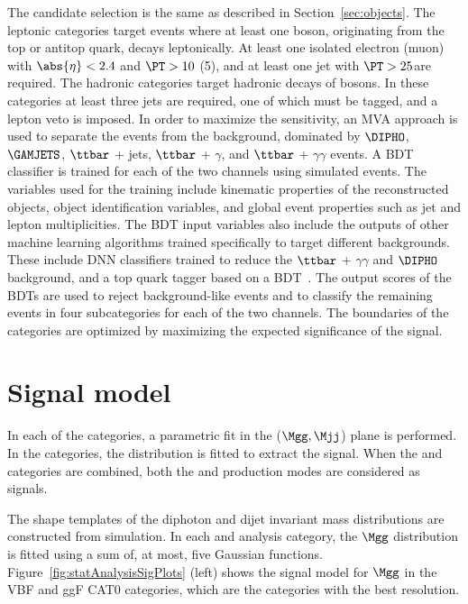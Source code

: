 \documentclass[11pt,a4paper,cmspaper,final,collab]{cms-tdr}
\begin{document}
The \Hgg candidate selection is the same as described in Section~\ref{sec:objects}. 
The \ttH leptonic categories target \ttH events where at least one \PW boson, originating from the top or antitop quark, decays leptonically. At least one isolated electron (muon) with $\abs{\eta} <2.4$ and $\PT>10$ (5)\GeV, and at least one jet with $\PT>25$\GeV are required. The \ttH hadronic categories target hadronic decays of \PW bosons. In these categories at least three jets are required, one of which must be {\cPqb} tagged, and a lepton veto is imposed. In order to maximize the sensitivity, an MVA approach is used to separate the \ttH events from the background, dominated by $\DIPHO$, $\GAMJETS$, $\ttbar$ + jets, $\ttbar$ + $\gamma$, and $\ttbar$ + $\gamma\gamma$ events. A BDT classifier is trained for each of the two channels using simulated events.
The variables used for the training include kinematic properties of the reconstructed objects, object identification variables, and global event properties such as jet and lepton multiplicities. The BDT input variables also include the outputs of other machine learning algorithms trained specifically to target different backgrounds.
These include DNN classifiers trained to reduce the $\ttbar$ + $\gamma\gamma$ and $\DIPHO$ background, and a top quark tagger based on a BDT~\cite{Sirunyan:2017wif}.
 The output scores of the BDTs are used to reject background-like events and to classify the remaining  events in four subcategories for each of the two channels. The boundaries of the categories are optimized by maximizing the expected significance of the \ttH signal.



\section{Signal model}
\label{sec:signal}

In each of the \HH categories, a parametric fit in the ($\Mgg,\Mjj$) plane is performed. In the \ttH categories, the \Mgg distribution is fitted to extract the signal. When the \HH and \ttH categories are combined, both the \HH and \ttH production modes are considered as signals.

The shape templates of the diphoton and dijet invariant mass distributions are constructed from simulation. 
In each \HH and \ttH analysis category, the $\Mgg$ distribution is fitted using a sum
of, at most, five Gaussian functions.
Figure~\ref{fig:statAnalysisSigPlots} (left) shows the signal model for $\Mgg$ in the VBF and ggF CAT0 categories, which are the categories with the best resolution.
\end{document}
